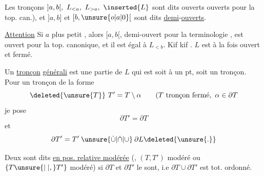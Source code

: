 Les tronçons $]a,b[,\ L_{<a},\ L_{>a},\ \inserted{L}$ sont dits ouverts    ouverts pour la top. can.),  et $]a,b]$ et $[b,\unsure{o|a|0}[$ sont dits \uline{demi}-\uline{ouverts}.

\uline{Attention}  Si $a$ plus petit , alors $[a,b[$,   demi-ouvert pour la terminologie , est  ouvert pour la top. canonique, et il est égal à $L_{<b}$. Kif kif . $L$ est à la fois ouvert et fermé.

Un \uline{tronçon} \uline{générali}  est une partie de $L$ qui est soit  à un pt, soit un tronçon. Pour un tronçon de la forme
\[
\deleted{\unsure{T}}\ T'=T\setminus\alpha\qquad(T\text{ tronçon fermé},\ \alpha\in\partial T
\]
je pose
\[
\partial T'=\partial T
\]
et  
\[
\partial T'=T'\mathbin{\unsure{\dot\cup|\dot\cap|\cup}}\partial L\deleted{\unsure{.}}
\]

 Deux   sont dits \uline{en pos. relative modérée} (, $(T,T')$  modéré ou $\{T\unsure{\mid|,}T'\}$ modéré) si $\partial T$ et $\partial T'$ le sont, i.e $\partial T\cup\partial T'$ est tot. ordonné.
